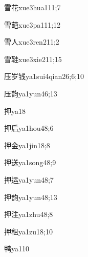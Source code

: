 \begin{verbete}{雪花}{xue3hua1}{11;7}
\end{verbete}
\begin{verbete}{雪葩}{xue3pa1}{11;12}
\end{verbete}
\begin{verbete}{雪人}{xue3ren2}{11;2}
\end{verbete}
\begin{verbete}{雪鞋}{xue3xie2}{11;15}
\end{verbete}
\begin{verbete}{压岁钱}{ya1sui4qian2}{6;6;10}
\end{verbete}
\begin{verbete}{压韵}{ya1yun4}{6;13}
\end{verbete}
\begin{verbete}{押}{ya1}{8}
\end{verbete}
\begin{verbete}{押后}{ya1hou4}{8;6}
\end{verbete}
\begin{verbete}{押金}{ya1jin1}{8;8}
\end{verbete}
\begin{verbete}{押送}{ya1song4}{8;9}
\end{verbete}
\begin{verbete}{押运}{ya1yun4}{8;7}
\end{verbete}
\begin{verbete}{押韵}{ya1yun4}{8;13}
\end{verbete}
\begin{verbete}{押注}{ya1zhu4}{8;8}
\end{verbete}
\begin{verbete}{押租}{ya1zu1}{8;10}
\end{verbete}
\begin{verbete}{鸭}{ya1}{10}
\end{verbete}
